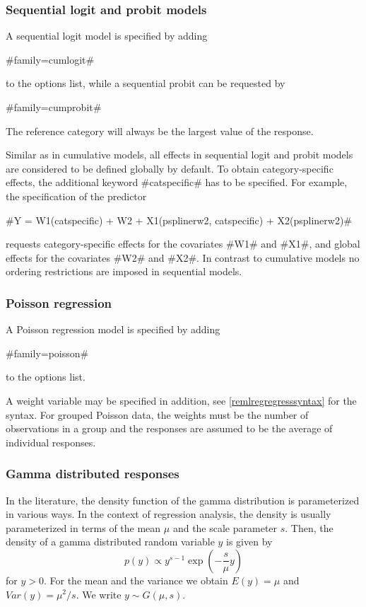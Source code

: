 \subsubsection*{Sequential logit and probit models}

A sequential logit model is specified by adding

#family=cumlogit#

to the options list, while a sequential probit can be requested by

#family=cumprobit#

The reference category will always be the largest value of the
response.

Similar as in cumulative models, all effects in sequential logit and
probit models are considered to be defined globally by default. To
obtain category-specific effects, the additional keyword
#catspecific# has to be specified. For example, the specification of
the predictor

 #Y = W1(catspecific) + W2 + X1(psplinerw2, catspecific) + X2(psplinerw2)#

requests category-specific effects for the covariates #W1# and #X1#,
and global effects for the covariates #W2# and #X2#. In contrast to
cumulative models no ordering restrictions are imposed in sequential
models.

\subsubsection*{Poisson regression}

A Poisson regression model is specified by adding

#family=poisson#

to the options list.

A weight variable may be specified in addition, see
\autoref{remlregregresssyntax} for the syntax. For grouped Poisson
data, the weights must be the number of observations in a group and
the responses are assumed to be the average of individual responses.

\subsubsection*{Gamma distributed responses}

In the literature, the density function of the gamma distribution is
parameterized in various ways. In the context of regression
analysis, the density is usually parameterized in terms of the mean
$\mu$ and the scale parameter $s$. Then, the density of a gamma
distributed random variable $y$ is given by
\begin{equation}
\label{remlgammapar1} p(y) \propto y^{s-1}\exp(-\frac{s}{\mu} y)
\end{equation}
for $y > 0$. For the mean and the variance we obtain $E(y) = \mu$
and $Var(y) = \mu^2/s$. We write $y \sim G(\mu,s)$.

